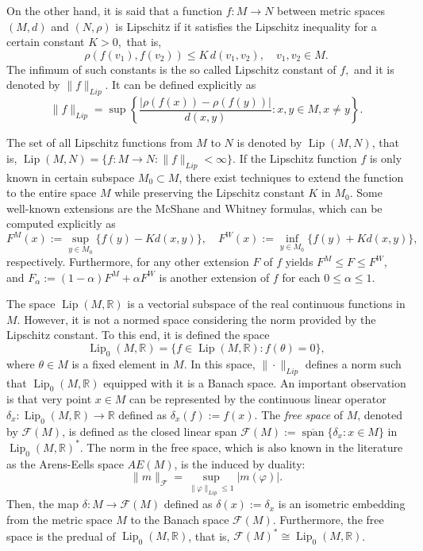 \documentclass[preprint,12pt]{elsarticle}
\begin{document}
On the other hand, it is said that a function $f:M \to N$ between metric spaces $(M,d)$ and $(N,\rho)$ is Lipschitz if it satisfies the Lipschitz inequality for a certain constant $K>0,$ that is,
$$
\rho(f(v_1),f(v_2)) \le K \, d(v_1,v_2), \quad v_1,v_2 \in M. 
$$
The infimum of such constants is the so called Lipschitz constant of $f,$ and it is denoted by $\|f\|_{Lip}$. It can be defined explicitly as 
$$
\|f\|_{Lip}=\sup\left\{\frac{|\rho(f(x))-\rho(f(y))|}{d(x,y)}:x,y\in M, x\neq y\right\}.
$$

The set of all Lipschitz functions from $M$ to $N$ is denoted by $\operatorname{Lip}(M,N)$, that is, $\operatorname{Lip}(M,N)=\{f\colon M\to N : \|f\|_{Lip}<\infty\}$. If the Lipschitz function $f$ is only known in certain subspace $M_0\subset M$, there exist techniques to extend the function to the entire space $M$ while preserving the Lipschitz constant $K$ in $M_0$. Some well-known extensions are the McShane and Whitney formulas, which can be computed explicitly as
$$F^M(x):=\sup_{y\in M_0}\{f(y)-Kd(x,y)\}, \quad F^W(x):=\inf_{y\in M_0}\{f(y)+Kd(x,y)\},$$
respectively. Furthermore, for any other extension $F$ of $f$ yields $F^M\leq F\leq F^W$, and $F_\alpha:=(1-\alpha)F^M+\alpha F^W$ is another extension of $f$ for each $0\leq\alpha\leq 1$.

The space $\operatorname{Lip}(M,\mathbb R)$ is a vectorial subspace of the real continuous functions in $M$. However, it is not a normed space considering the norm provided by the Lipschitz constant. To this end, it is defined the space $$\operatorname{Lip}_0(M,\mathbb R)=\{f\in\operatorname{Lip}(M,\mathbb R):f(\theta)=0\},$$
where $\theta\in M$ is a fixed element in $M$. In this space, $\|\cdot\|_{Lip}$ defines a norm such that $\operatorname{Lip}_0(M, \mathbb R)$ equipped with it is a Banach space. An important observation is that very point $x\in M$ can be represented by the continuous linear operator $\delta_x\colon \operatorname{Lip}_0(M, \mathbb R)\to\mathbb R$ defined as $\delta_x(f):=f(x)$. The \emph{free space} of $M$, denoted by $\mathcal{F}(M)$, is defined as the closed linear span $\mathcal{F}(M):=\overline{\operatorname{span}}\{\delta_x:x\in M\}$ in $\operatorname{Lip}_0(M,\mathbb R)^*$. The norm in the free space, which is also known in the literature as the Arens-Eells space $AE(M)$, is the induced by duality: $$\|m\|_{\mathcal F}=\sup_{\|\varphi\|_{Lip}\leq 1} |m(\varphi)|.$$ Then, the map $\delta\colon M\to\mathcal F(M)$ defined as $\delta(x):=\delta_x$ is an isometric embedding from the metric space $M$ to the Banach space $\mathcal F(M)$. Furthermore, the free space is the predual of $\operatorname{Lip}_0(M,\mathbb R)$, that is, $\mathcal F(M)^*\cong \operatorname{Lip}_0(M,\mathbb R)$.
\end{document}
